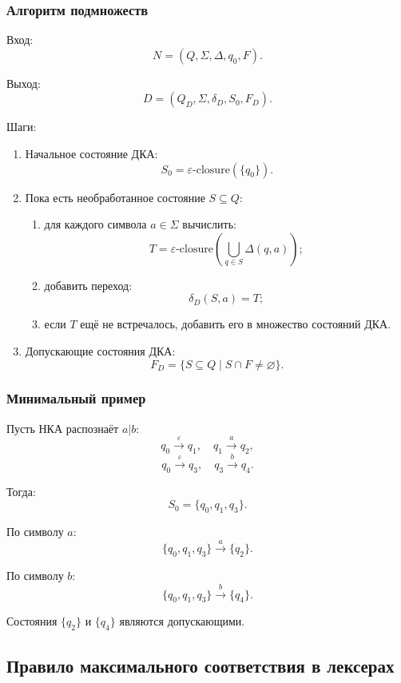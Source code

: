 \documentclass[12pt,a4paper]{article}
\theoremstyle{definition}
\theoremstyle{plain}
\begin{document}
\subsubsection*{Алгоритм подмножеств}

Вход:
\[
N=(Q,\Sigma,\Delta,q_0,F).
\]

Выход:
\[
D=(Q_D,\Sigma,\delta_D,S_0,F_D).
\]

Шаги:
\begin{enumerate}
    \item Начальное состояние ДКА:
    \[
    S_0=\varepsilon\text{-closure}(\{q_0\}).
    \]
    \item Пока есть необработанное состояние $S\subseteq Q$:
    \begin{enumerate}
        \item для каждого символа $a\in\Sigma$ вычислить:
        \[
        T=\varepsilon\text{-closure}
        \left(
        \bigcup_{q\in S}\Delta(q,a)
        \right);
        \]
        \item добавить переход:
        \[
        \delta_D(S,a)=T;
        \]
        \item если $T$ ещё не встречалось, добавить его в множество состояний ДКА.
    \end{enumerate}
    \item Допускающие состояния ДКА:
    \[
    F_D=\{S\subseteq Q \mid S\cap F\neq \varnothing\}.
    \]
\end{enumerate}

\subsubsection*{Минимальный пример}

Пусть НКА распознаёт $a|b$:
\[
q_0 \xrightarrow{\varepsilon} q_1,\quad q_1\xrightarrow{a}q_2,
\]
\[
q_0 \xrightarrow{\varepsilon} q_3,\quad q_3\xrightarrow{b}q_4.
\]

Тогда:
\[
S_0=\{q_0,q_1,q_3\}.
\]

По символу $a$:
\[
\{q_0,q_1,q_3\}\xrightarrow{a}\{q_2\}.
\]

По символу $b$:
\[
\{q_0,q_1,q_3\}\xrightarrow{b}\{q_4\}.
\]

Состояния $\{q_2\}$ и $\{q_4\}$ являются допускающими.

\subsection{Правило максимального соответствия в лексерах}
\end{document}

